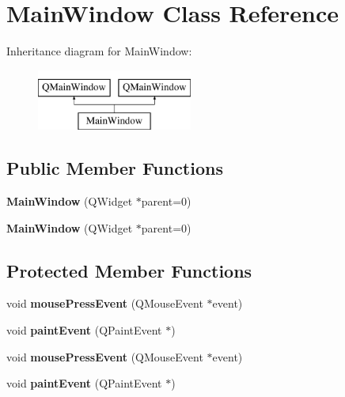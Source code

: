 \hypertarget{classMainWindow}{\section{Main\-Window Class Reference}
\label{classMainWindow}
}
Inheritance diagram for Main\-Window\-:\begin{figure}[H]
\begin{center}
\leavevmode
\includegraphics[height=2.000000cm]{classMainWindow}
\end{center}
\end{figure}
\subsection*{Public Member Functions}
\begin{DoxyCompactItemize}
\item 
\hypertarget{classMainWindow_a8b244be8b7b7db1b08de2a2acb9409db}{{\bfseries Main\-Window} (Q\-Widget $\ast$parent=0)}\label{classMainWindow_a8b244be8b7b7db1b08de2a2acb9409db}

\item 
\hypertarget{classMainWindow_a8b244be8b7b7db1b08de2a2acb9409db}{{\bfseries Main\-Window} (Q\-Widget $\ast$parent=0)}\label{classMainWindow_a8b244be8b7b7db1b08de2a2acb9409db}

\end{DoxyCompactItemize}
\subsection*{Protected Member Functions}
\begin{DoxyCompactItemize}
\item 
\hypertarget{classMainWindow_a2b5463ae209a03d1680b39c950dac8be}{void {\bfseries mouse\-Press\-Event} (Q\-Mouse\-Event $\ast$event)}\label{classMainWindow_a2b5463ae209a03d1680b39c950dac8be}

\item 
\hypertarget{classMainWindow_a2da19b23a75b83dcc8b8f6b6128463a3}{void {\bfseries paint\-Event} (Q\-Paint\-Event $\ast$)}\label{classMainWindow_a2da19b23a75b83dcc8b8f6b6128463a3}

\item 
\hypertarget{classMainWindow_a2b5463ae209a03d1680b39c950dac8be}{void {\bfseries mouse\-Press\-Event} (Q\-Mouse\-Event $\ast$event)}\label{classMainWindow_a2b5463ae209a03d1680b39c950dac8be}

\item 
\hypertarget{classMainWindow_a2da19b23a75b83dcc8b8f6b6128463a3}{void {\bfseries paint\-Event} (Q\-Paint\-Event $\ast$)}\label{classMainWindow_a2da19b23a75b83dcc8b8f6b6128463a3}

\end{DoxyCompactItemize}


